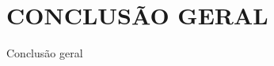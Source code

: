 \section{\texorpdfstring{\MakeUppercase{Conclusão geral}}{}}
\label{resultados__conclusao-geral}

Conclusão geral
